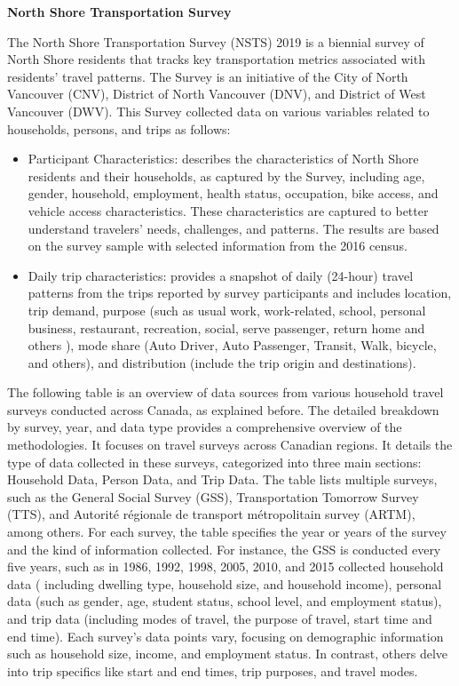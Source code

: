\documentclass[
11pt, %
oneside, %
english, %
singlespacing, %
]{macthesis} %
\begin{document}
\textbf{North Shore Transportation Survey}

The North Shore Transportation Survey (NSTS) 2019 is a biennial survey of North Shore residents that tracks key transportation metrics associated with residents' travel patterns. The Survey is an initiative of the City of North Vancouver (CNV), District of North Vancouver (DNV), and District of West Vancouver (DWV). This Survey collected data on various variables related to households, persons, and trips as follows:

\begin{itemize}
\item
  Participant Characteristics: describes the characteristics of North Shore residents and their households, as captured by the Survey, including age, gender, household, employment, health status, occupation, bike access, and vehicle access characteristics. These characteristics are captured to better understand travelers' needs, challenges, and patterns. The results are based on the survey sample with selected information from the 2016 census.
\item
  Daily trip characteristics: provides a snapshot of daily (24-hour) travel patterns from the trips reported by survey participants and includes location, trip demand, purpose (such as usual work, work-related, school, personal business, restaurant, recreation, social, serve passenger, return home and others ), mode share (Auto Driver, Auto Passenger, Transit, Walk, bicycle, and others), and distribution (include the trip origin and destinations).
\end{itemize}

The following table is an overview of data sources from various household travel surveys conducted across Canada, as explained before. The detailed breakdown by survey, year, and data type provides a comprehensive overview of the methodologies. It focuses on travel surveys across Canadian regions. It details the type of data collected in these surveys, categorized into three main sections: Household Data, Person Data, and Trip Data. The table lists multiple surveys, such as the General Social Survey (GSS), Transportation Tomorrow Survey (TTS), and Autorité régionale de transport métropolitain survey (ARTM), among others. For each survey, the table specifies the year or years of the survey and the kind of information collected. For instance, the GSS is conducted every five years, such as in 1986, 1992, 1998, 2005, 2010, and 2015 collected household data ( including dwelling type, household size, and household income), personal data (such as gender, age, student status, school level, and employment status), and trip data (including modes of travel, the purpose of travel, start time and end time). Each survey's data points vary, focusing on demographic information such as household size, income, and employment status. In contrast, others delve into trip specifics like start and end times, trip purposes, and travel modes.
\end{document}
